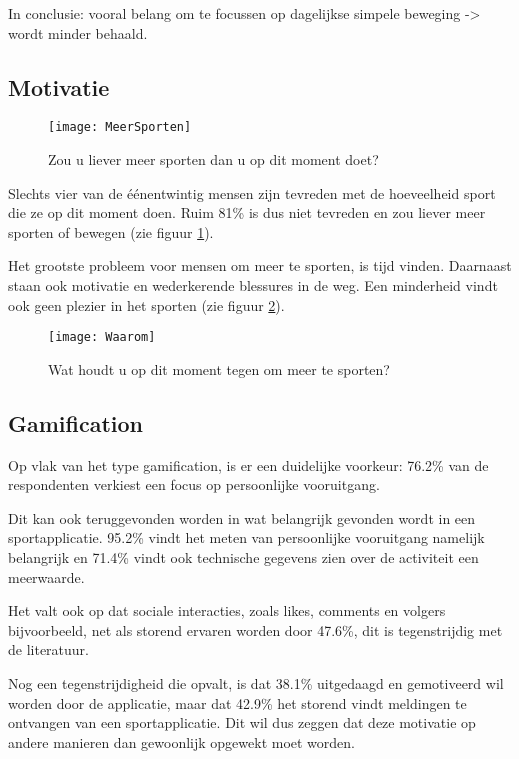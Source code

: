 In conclusie: vooral belang om te focussen op dagelijkse simpele beweging -> wordt minder behaald.

\subsection{Motivatie}

\begin{figure}[h]
    \caption[Zou u liever meer sporten dan u op dit moment doet?]{Zou u liever meer sporten dan u op dit moment doet?}
    \texttt{[image: MeerSporten]}
    \label{fig:meerBewegen}
\end{figure}

Slechts vier van de éénentwintig mensen zijn tevreden met de hoeveelheid sport die ze op dit moment doen. Ruim 81\% is dus niet tevreden en zou liever meer sporten of bewegen (zie figuur \ref{fig:meerBewegen}).

Het grootste probleem voor mensen om meer te sporten, is tijd vinden. Daarnaast staan ook motivatie en wederkerende blessures in de weg. Een minderheid vindt ook geen plezier in het sporten (zie figuur \ref{fig:waarom}).

\begin{figure}[h]
    \caption[Wat houdt u op dit moment tegen om meer te sporten?]{Wat houdt u op dit moment tegen om meer te sporten?}
    \texttt{[image: Waarom]}
    \label{fig:waarom}
\end{figure}

\subsection{Gamification}

Op vlak van het type gamification, is er een duidelijke voorkeur: 76.2\% van de respondenten verkiest een focus op persoonlijke vooruitgang.

Dit kan ook teruggevonden worden in wat belangrijk gevonden wordt in een sportapplicatie. 95.2\% vindt het meten van persoonlijke vooruitgang namelijk belangrijk en 71.4\% vindt ook technische gegevens zien over de activiteit een meerwaarde.

Het valt ook op dat sociale interacties, zoals likes, comments en volgers bijvoorbeeld, net als storend ervaren worden door 47.6\%, dit is tegenstrijdig met de literatuur.

Nog een tegenstrijdigheid die opvalt, is dat 38.1\% uitgedaagd en gemotiveerd wil worden door de applicatie, maar dat 42.9\% het storend vindt meldingen te ontvangen van een sportapplicatie. Dit wil dus zeggen dat deze motivatie op andere manieren dan gewoonlijk opgewekt moet worden.

